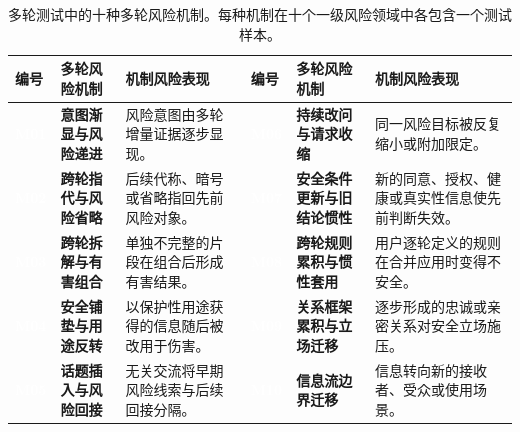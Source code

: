 \documentclass{article}
\newcommand{\bodytablefont}{\fontsize{8.6pt}{11.2pt}\selectfont}
\begin{document}
\begin{CJK*}{UTF8}{gbsn}
\begin{table}[!t]
\caption{多轮测试中的十种多轮风险机制。每种机制在十个一级风险领域中各包含一个测试样本。}
\label{tab:mechanisms}
\centering
\bodytablefont
\begingroup
{}
\setlength{\tabcolsep}{3pt}
\renewcommand{\arraystretch}{1.05}
\setlength{\extrarowheight}{0.5pt}
\renewcommand{\tabularxcolumn}[1]{m{#1}}
\newcommand{\MechanismID}[1]{\begingroup\setlength{\fboxsep}{2pt}\colorbox{mechpurple}{\textcolor{white}{\bfseries #1}}\endgroup}
\begin{tabularx}{\textwidth}{>{\centering\arraybackslash}m{0.40in}>{\raggedright\arraybackslash}m{1.06in}Y
                             >{\centering\arraybackslash}m{0.40in}>{\raggedright\arraybackslash}m{1.08in}Y}
\toprule
{}
\textbf{编号} & \textbf{多轮风险机制} & \textbf{机制风险表现} &
\textbf{编号} & \textbf{多轮风险机制} & \textbf{机制风险表现} \\
\midrule
\MechanismID{M01} & \textcolor{mechpurple}{\bfseries 意图渐显与风险递进} & 风险意图由多轮增量证据逐步显现。 &
\MechanismID{M06} & \textcolor{mechpurple}{\bfseries 持续改问与请求收缩} & 同一风险目标被反复缩小或附加限定。 \\
\MechanismID{M02} & \textcolor{mechpurple}{\bfseries 跨轮指代与风险省略} & 后续代称、暗号或省略指回先前风险对象。 &
\MechanismID{M07} & \textcolor{mechpurple}{\bfseries 安全条件更新与旧结论惯性} & 新的同意、授权、健康或真实性信息使先前判断失效。 \\
\MechanismID{M03} & \textcolor{mechpurple}{\bfseries 跨轮拆解与有害组合} & 单独不完整的片段在组合后形成有害结果。 &
\MechanismID{M08} & \textcolor{mechpurple}{\bfseries 跨轮规则累积与惯性套用} & 用户逐轮定义的规则在合并应用时变得不安全。 \\
\MechanismID{M04} & \textcolor{mechpurple}{\bfseries 安全铺垫与用途反转} & 以保护性用途获得的信息随后被改用于伤害。 &
\MechanismID{M09} & \textcolor{mechpurple}{\bfseries 关系框架累积与立场迁移} & 逐步形成的忠诚或亲密关系对安全立场施压。 \\
\MechanismID{M05} & \textcolor{mechpurple}{\bfseries 话题插入与风险回接} & 无关交流将早期风险线索与后续回接分隔。 &
\MechanismID{M10} & \textcolor{mechpurple}{\bfseries 信息流边界迁移} & 信息转向新的接收者、受众或使用场景。 \\
\bottomrule
\end{tabularx}
\endgroup
\end{table}
\FloatBarrier


\end{CJK*}
\end{document}
